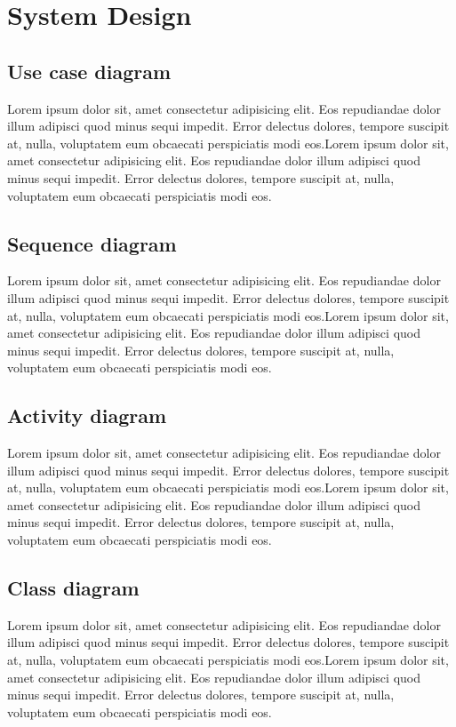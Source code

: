 \chapter{System Design}\label{System Design}
\section{Use case diagram}
Lorem ipsum dolor sit, amet consectetur adipisicing elit. Eos repudiandae dolor illum adipisci quod minus sequi impedit. Error delectus dolores, tempore suscipit at, nulla, voluptatem eum obcaecati perspiciatis modi eos.Lorem ipsum dolor sit, amet consectetur adipisicing elit. Eos repudiandae dolor illum adipisci quod minus sequi impedit. Error delectus dolores, tempore suscipit at, nulla, voluptatem eum obcaecati perspiciatis modi eos.
\section{Sequence diagram}
Lorem ipsum dolor sit, amet consectetur adipisicing elit. Eos repudiandae dolor illum adipisci quod minus sequi impedit. Error delectus dolores, tempore suscipit at, nulla, voluptatem eum obcaecati perspiciatis modi eos.Lorem ipsum dolor sit, amet consectetur adipisicing elit. Eos repudiandae dolor illum adipisci quod minus sequi impedit. Error delectus dolores, tempore suscipit at, nulla, voluptatem eum obcaecati perspiciatis modi eos.
\section{Activity diagram}
Lorem ipsum dolor sit, amet consectetur adipisicing elit. Eos repudiandae dolor illum adipisci quod minus sequi impedit. Error delectus dolores, tempore suscipit at, nulla, voluptatem eum obcaecati perspiciatis modi eos.Lorem ipsum dolor sit, amet consectetur adipisicing elit. Eos repudiandae dolor illum adipisci quod minus sequi impedit. Error delectus dolores, tempore suscipit at, nulla, voluptatem eum obcaecati perspiciatis modi eos.
\section{Class diagram}

Lorem ipsum dolor sit, amet consectetur adipisicing elit. Eos repudiandae dolor illum adipisci quod minus sequi impedit. Error delectus dolores, tempore suscipit at, nulla, voluptatem eum obcaecati perspiciatis modi eos.Lorem ipsum dolor sit, amet consectetur adipisicing elit. Eos repudiandae dolor illum adipisci quod minus sequi impedit. Error delectus dolores, tempore suscipit at, nulla, voluptatem eum obcaecati perspiciatis modi eos.
